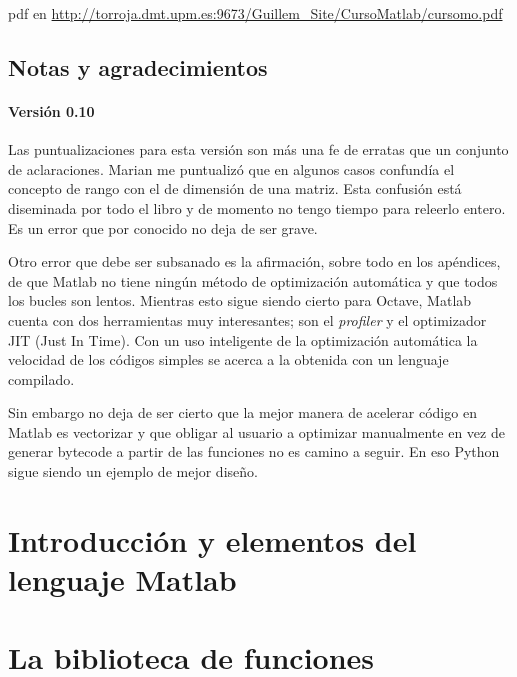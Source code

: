 \documentclass[10pt,fleqn,a4]{book}
\begin{document}
pdf en \url{http://torroja.dmt.upm.es:9673/Guillem_Site/CursoMatlab/cursomo.pdf}


\chapter*{Notas y agradecimientos}
\subsection*{Versión 0.10}
Las puntualizaciones para esta versión son más una fe de erratas que
un conjunto de aclaraciones.  Marian me puntualizó que en algunos
casos confundía el concepto de rango con el de dimensión de una
matriz.  Esta confusión está diseminada por todo el libro y de momento
no tengo tiempo para releerlo entero.  Es un error que por conocido no
deja de ser grave.

Otro error que debe ser subsanado es la afirmación, sobre todo en los
apéndices, de que Matlab no tiene ningún método de optimización
automática y que todos los bucles son lentos.  Mientras esto sigue
siendo cierto para Octave, Matlab cuenta con dos herramientas muy
interesantes; son el \emph{profiler} y el optimizador JIT (Just In
Time).  Con un uso inteligente de la optimización automática la
velocidad de los códigos simples se acerca a la obtenida con un
lenguaje compilado.

Sin embargo no deja de ser cierto que la mejor manera de acelerar
código en Matlab es vectorizar y que obligar al usuario a optimizar
manualmente en vez de generar bytecode a partir de las funciones no es
camino a seguir.  En eso Python sigue siendo un ejemplo de mejor
diseño.


\tableofcontents{}

\listoffigures


\part{Introducción y elementos del lenguaje Matlab}





\part{La biblioteca de funciones}
\end{document}
